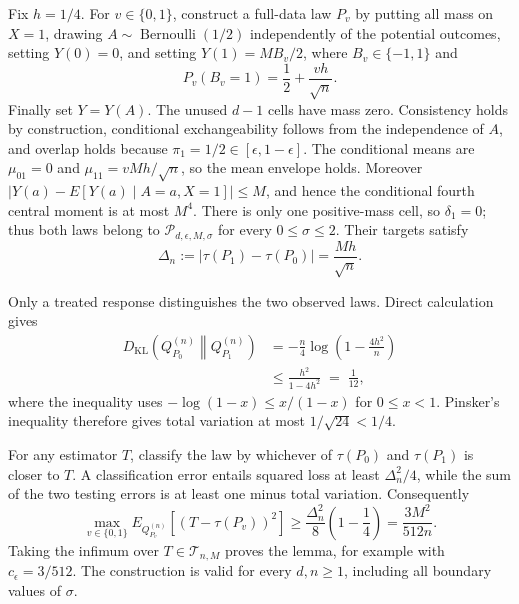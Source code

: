 Fix \(h=1/4\).  For \(v\in\{0,1\}\), construct a full-data law \(P_v\) by putting all mass on \(X=1\), drawing \(A\sim\operatorname{Bernoulli}(1/2)\) independently of the potential outcomes, setting \(Y(0)=0\), and setting \(Y(1)=MB_v/2\), where \(B_v\in\{-1,1\}\) and
\[
 P_v(B_v=1)=\frac12+\frac{vh}{\sqrt n}.
\tag{1}
\]
Finally set \(Y=Y(A)\).  The unused \(d-1\) cells have mass zero.  Consistency holds by construction, conditional exchangeability follows from the independence of \(A\), and overlap holds because \(\pi_1=1/2\in[\epsilon,1-\epsilon]\).  The conditional means are \(\mu_{01}=0\) and \(\mu_{11}=vMh/\sqrt n\), so the mean envelope holds.  Moreover \(|Y(a)-E[Y(a)\mid A=a,X=1]|\le M\), and hence the conditional fourth central moment is at most \(M^4\).  There is only one positive-mass cell, so \(\delta_1=0\); thus both laws belong to \(\mathcal P_{d,\epsilon,M,\sigma}\) for every \(0\le\sigma\le2\).  Their targets satisfy
\[
 \Delta_n:=|\tau(P_1)-\tau(P_0)|=\frac{Mh}{\sqrt n}.
\tag{2}
\]

Only a treated response distinguishes the two observed laws.  Direct calculation gives
\[
 \begin{aligned}
 D_{\mathrm{KL}}\!\left(Q_{P_0}^{(n)}\middle\|Q_{P_1}^{(n)}\right)
 &=-\frac n4\log\left(1-\frac{4h^2}{n}\right)\\
 &\le \frac{h^2}{1-4h^2}\;=\;\frac1{12},
 \end{aligned}
\tag{3}
\]
where the inequality uses \(-\log(1-x)\le x/(1-x)\) for \(0\le x<1\).  Pinsker's inequality therefore gives total variation at most \(1/\sqrt{24}<1/4\).

For any estimator \(T\), classify the law by whichever of \(\tau(P_0)\) and \(\tau(P_1)\) is closer to \(T\).  A classification error entails squared loss at least \(\Delta_n^2/4\), while the sum of the two testing errors is at least one minus total variation.  Consequently
\[
 \max_{v\in\{0,1\}}E_{Q_{P_v}^{(n)}}[(T-\tau(P_v))^2]
 \ge \frac{\Delta_n^2}{8}\left(1-\frac14\right)
 =\frac{3M^2}{512n}.
\tag{4}
\]
Taking the infimum over \(T\in\mathcal T_{n,M}\) proves the lemma, for example with \(c_{\epsilon}=3/512\).  The construction is valid for every \(d,n\ge1\), including all boundary values of \(\sigma\).